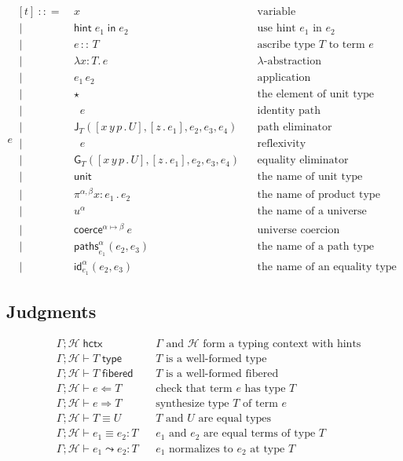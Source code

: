 \documentclass{article}
\newcommand{\G}{\Gamma} %
\newcommand{\T}{T} %
\newcommand{\U}{U} %
\newcommand{\x}{x} %
\newcommand{\e}{e} %
\newcommand{\bnf}{\ \mathrel{{:}{:}{=}}\ }
\newcommand{\bnfor}{\ \mid\ \ }
\newcommand{\lam}[2]{\lambda #1 {:} #2 .\,} %
\newcommand{\app}[2]{#1\,#2} %
\newcommand{\abst}[2]{[#1 \,.\, #2]} %
\newcommand{\ascribe}[2]{#1 \,{:}{:}\, #2} %
\newcommand{\unitTerm}{\star} %
\newcommand{\coerce}[3]{\mathsf{coerce}^{#2{\mapsto}#3}\ #1}
\newcommand{\PrElim}[6]{\mathsf{J}_{#1}(#2, #3, #4, #5, #6)} %
\newcommand{\JuElim}[6]{\mathsf{G}_{#1}(#2, #3, #4, #5, #6)} %
\newcommand{\prRefl}[1]{\mathop{\mathsf{idpath}_{#1}}}  %
\newcommand{\juRefl}[1]{\mathop{\mathsf{refl}_{#1}}}    %
\newcommand{\nUnit}{\mathsf{unit}} %
\newcommand{\nProd}[3]{\pi^{#1} #2 {:} #3 \,.\,} %
\newcommand{\nUniverse}[1]{u^{#1}}  %
\newcommand{\nPrEqual}[4]{\mathsf{paths}^{#1}_{#2}(#3,#4)} %
\newcommand{\nJuEqual}[4]{\mathsf{id}^{#1}_{#2}(#3,#4)} %
\newcommand{\istype}[2]{#1 \vdash #2\;\mathsf{type}} %
\newcommand{\isfib}[2]{#1 \vdash #2\;\mathsf{fibered}} %
\newcommand{\eqtype}[3]{#1 \vdash #2 \equiv #3} %
\newcommand{\eqterm}[4]{#1 \vdash #2 \equiv #3 : #4} %
\newcommand{\chkterm}[3]{#1 \vdash #2 \Leftarrow #3} %
\newcommand{\synterm}[3]{#1 \vdash #2 \Rightarrow #3} %
\newcommand{\hintin}[1]{\mathsf{hint}\;#1\;\mathsf{in}\;} %
\newcommand{\ishint}[2]{#1 ; #2 \; \mathsf{hctx}}
\renewcommand{\H}{\mathcal{H}}      %
\newcommand{\GH}{\G ; \H}           %
\newcommand{\whnf}[4]{#1 \vdash #2 \leadsto #3 : #4} %
\begin{document}
\begin{equation*}
  \e
  \begin{aligned}[t]
    \bnf   {}&  \x   &&\text{variable} \\
    \bnfor {}&  \hintin{\e_1} e_2 &&\text{use hint $\e_1$ in $\e_2$} \\
    \bnfor {}&  \ascribe{\e}{\T}  &&\text{ascribe type $\T$ to term $\e$} \\
    \bnfor {}&  \lam{\x}{\T} \e  &&\text{$\lambda$-abstraction} \\
    \bnfor {}&   \app{\e_1}{\e_2}  &&\text{application} \\
    \bnfor {}&  \unitTerm  &&\text{the element of unit type} \\
    \bnfor {}&  \prRefl{\T}{\e}  &&\text{identity path} \\
    \bnfor {}&  \PrElim{\T}{\abst{x\,y\,p}{\U}}{\abst{z}{\e_1}}{\e_2}{\e_3}{\e_4}  &&\text{path eliminator} \\
    \bnfor {}&  \juRefl{\T}{\e}  &&\text{reflexivity} \\
    \bnfor {}&  \JuElim{\T}{\abst{x\,y\,p}{\U}}{\abst{z}{\e_1}}{\e_2}{\e_3}{\e_4}  &&\text{equality eliminator} \\
    \bnfor {}&  \nUnit  &&\text{the name of unit type} \\
    \bnfor {}&  \nProd{\alpha,\beta}{\x}{\e_1} \e_2  &&\text{the name of product type} \\
    \bnfor {}&  \nUniverse{\alpha} &&\text{the name of a universe} \\
    \bnfor {}&  \coerce{\e}{\alpha}{\beta}  &&\text{universe coercion} \\
    \bnfor {}&  \nPrEqual{\alpha}{\e_1}{\e_2}{\e_3}  &&\text{the name of a path type} \\
    \bnfor {}&  \nJuEqual{\alpha}{\e_1}{\e_2}{\e_3}  &&\text{the name of an equality type}
  \end{aligned}
\end{equation*}

\subsection{Judgments}
\label{sec:bidirectional-judgments}

\begin{align*}
& \ishint{\G}{\H} & & \text{$\G$ and $\H$ form a typing context with hints} \\
& \istype{\GH}{\T} & & \text{$\T$ is a well-formed type} \\
& \isfib{\GH}{\T} & & \text{$\T$ is a well-formed fibered} \\
& \chkterm{\GH}{\e}{\T} & & \text{check that term $\e$ has type $T$} \\
& \synterm{\GH}{\e}{\T} & & \text{synthesize type $\T$ of term $e$} \\
& \eqtype{\GH}{\T}{\U} & & \text{$\T$ and $\U$ are equal types} \\
& \eqterm{\GH}{\e_1}{\e_2}{\T} & & \text{$\e_1$ and $\e_2$ are equal terms of type $\T$} \\
& \whnf{\GH}{\e_1}{\e_2}{\T} & & \text{$\e_1$ normalizes to $\e_2$ at type $\T$}
\end{align*}
\end{document}
